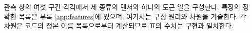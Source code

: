 
관측 창의 여섯 구간 각각에서 세 종류의 텐서와 하나의 토큰 열을 구성한다. 특징의 정확한 목록은 부록 \ref{app:features}에 있으며, 여기서는 구성 원리와 차원을 기술한다. 각 차원은 코드의 정본 이름 목록으로부터 계산되므로 표의 수치는 구현과 일치한다.
